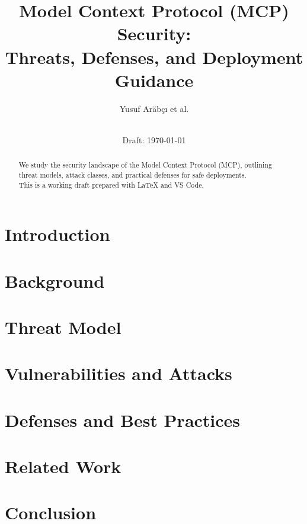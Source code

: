 \documentclass[11pt,a4paper]{article}
\title{Model Context Protocol (MCP) Security:\\ Threats, Defenses, and Deployment Guidance}
\author{Yusuf Ar\"{a}b\c{c}\i{} et al.}
\date{\\Draft: \today}
\begin{document}
\maketitle
\begin{abstract}
We study the security landscape of the Model Context Protocol (MCP), outlining threat models, attack classes, and practical defenses for safe deployments.\\
This is a working draft prepared with \LaTeX{} and VS Code.
\end{abstract}

\section{Introduction}

\section{Background}

\section{Threat Model}

\section{Vulnerabilities and Attacks}

\section{Defenses and Best Practices}

\section{Related Work}

\section{Conclusion}


\printbibliography
\end{document}
